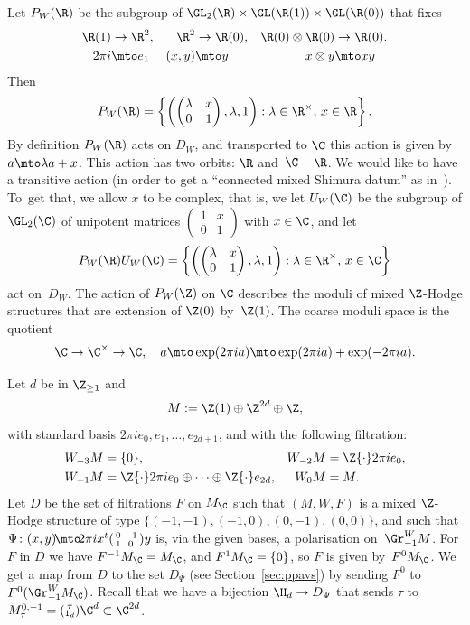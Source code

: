 Let $P_W(\R)$ be the subgroup of
$\GL_2(\R)\times\GL(\R(1))\times\GL(\R(0))$ that fixes
\begin{align*}
\R(1)&\to\R^2,&
\R^2&\to\R(0),&
\R(0)\otimes\R(0)&\to\R(0).\\
2\pi i&\mto e_1&
(x,y)&\mto y&
x\otimes y&\mto xy
\end{align*}
Then
\[
P_W(\R) =
\left\{\left(\begin{pmatrix}\lambda & x\\0&1\end{pmatrix}, \lambda, 1\right)
: \text{$\lambda\in\R^\times$, $x\in\R$}\right\}.
\]
By definition $P_W(\R)$ acts on $D_W$, and transported to $\C$ this
action is given by $a\mto \lambda a+x$. This action has two orbits:
$\R$ and~$\C-\R$. We would like to have a transitive action (in order
to get a ``connected mixed Shimura datum'' as in~\cite[Def.\,2.1]{Pink1}). To~get
that, we allow $x$ to be complex, that is, we let $U_W(\C)$ be the subgroup
of $\GL_2(\C)$ of unipotent matrices
$(\begin{smallmatrix}1 & x\\0&1\end{smallmatrix})$ with $x\in\C$, and
let
\[
P_W(\R)U_W(\C) =
\left\{\left(\begin{pmatrix}\lambda & x\\0&1\end{pmatrix}, \lambda, 1\right)
: \text{$\lambda\in\R^\times$, $x\in\C$}\right\}
\]
act on~$D_W$. The action of $P_W(\Z)$ on $\C$ describes the moduli of
mixed $\Z$-Hodge structures that are extension of $\Z(0)$
by~$\Z(1)$. The coarse moduli space is the quotient
\[
\C\to\C^\times\to \C, \quad
a\mto \exp(2\pi ia)\mto \exp(2\pi ia)+\exp(-2\pi ia).
\]

\label{sec:uptams}
Let $d$ be in $\Z_{\geq1}$ and
\[
M:=\Z(1)\oplus\Z^{2d}\oplus\Z,
\]
with
standard basis $2\pi i e_0,e_1,\ldots,e_{2d+1}$, and with the
following filtration:
\[
\begin{aligned}
W_{-3}M & =\{0\},& W_{-2}M&=\Z{\cdot}2\pi ie_0, \\
W_{-1}M & =\Z{\cdot}2\pi ie_0\oplus\cdots\oplus\Z{\cdot}e_{2d},
&W_{0}M&=M.
\end{aligned}
\]
Let $D$ be the set of filtrations $F$ on $M_\C$ such that $(M,W,F)$ is
a mixed $\Z$-Hodge structure of type $\{(-1,-1), (-1,0),(0,-1),
(0,0)\}$, and such that $\Psi\colon (x,y)\!\mto\!2\pi i
x^t(\begin{smallmatrix}0 & -1\\1&0\end{smallmatrix})y$ is, via the
given bases, a polarisation on~$\Gr^W_{-1}M$. For $F$ in $D$ we have
$F^{-1}M_\C=M_\C$, and $F^1M_\C=\{0\}$, so $F$ is given
by~$F^0M_\C$. We get a map from $D$ to the set $D_\Psi$
(see Section~\ref{sec:ppavs}) by sending $F^0$ to
$F^0(\Gr^W_{-1}M_\C)$. Recall that we have a bijection $\H_d\to
D_\Psi$ that sends $\tau$ to $M^{0,-1}_\tau=(\substack{\tau \\
1_d})\C^d\subset\C^{2d}$.


